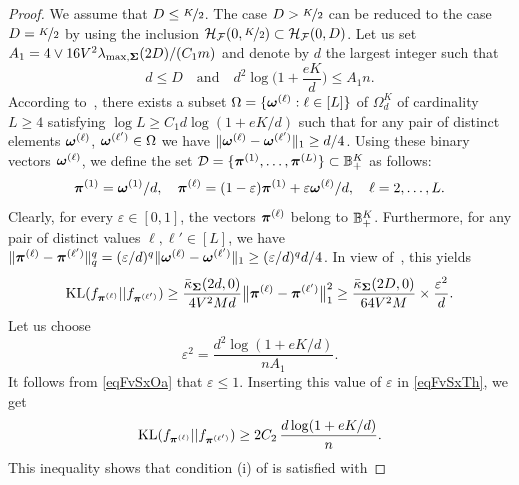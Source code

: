 \begin{proof}
	We assume that $D \leq \nicefrac{K}2$. The case $D> \nicefrac{K}2$ can be reduced to the
	case $D = \nicefrac{K}2$ by using the inclusion $\mathcal H_\mathcal F(0,\nicefrac{K}2)\subset \mathcal H_\mathcal F(0,D)$. Let us set $A_1 = 4\vee {16 V^2\lambda_{\max,\boldsymbol\Sigma}(2D)}/{(C_1 m)}$ 
	and denote by $d$ the largest integer such that
	\begin{equation}\label{eqFvSxOa}
	d\le D\quad\text{and}\quad d^2\log\Big(1+\frac{e  K}{d}\Big)\le A_1 n.
	\end{equation}
	According to~, there exists a subset
	$\Omega = \{\boldsymbol \omega^{(\ell)}:\ell\in[L]\}$ of  $\Omega_{d}^{K}$ of cardinality $L\ge 4$
	satisfying $\log L\geq {C_1 d}\log(1+{eK}/{d})$ such that for any pair of distinct 
	elements $\boldsymbol \omega^{(\ell)}$, $\boldsymbol \omega^{(\ell')}\in \Omega$ we have
	$\|\boldsymbol \omega^{(\ell)}-\boldsymbol \omega^{(\ell')}\|_1 \geq d/4$. Using these binary vectors $\boldsymbol \omega^{(\ell)}$, we define the set $\mathcal{D} =
	\{ \boldsymbol \pi^{(1)},\dots,\boldsymbol \pi^{(L)}\}\subset {\mathbb B}_+^{K}$ as follows:
	\begin{equation}\label{eqFvSxTw}
	\boldsymbol \pi^{(1)}=\boldsymbol \omega^{(1)}/d,\quad
	\boldsymbol \pi^{(\ell)}=(1-\varepsilon)\boldsymbol \pi^{(1)}+\varepsilon \boldsymbol \omega^{(\ell)}/d,\quad \ell=2,\ldots,L.
	\end{equation}
	Clearly, for every $\varepsilon\in[0,1]$, the vectors $\boldsymbol \pi^{(\ell)}$ belong to  ${\mathbb B}^K_+$.
	Furthermore, for any pair of distinct
	values $\ell,\ell'\in[L]$, we have $\|\boldsymbol \pi^{(\ell)}-\boldsymbol \pi^{(\ell')}\|_q^q = (\varepsilon/d)^q
	\|\boldsymbol \omega^{(\ell)}-\boldsymbol \omega^{(\ell')}\|_1\ge (\varepsilon/d)^qd/4$.  In view of~,
	this yields
	\begin{equation}\label{eqFvSxTh}
	{\rm KL}(f_{\boldsymbol \pi^{(\ell)}}||f_{\boldsymbol \pi^{(\ell')}})
	\geq \frac{\bar\kappa_{\boldsymbol\Sigma}(2d,0)}{4V^2M d} \big{\|}\boldsymbol \pi^{(\ell)} - \boldsymbol \pi^{(\ell')}\big{\|}_1^2
	\geq \frac{\bar\kappa_{\boldsymbol\Sigma}(2D,0)}{64V^2M}\times\frac{\varepsilon^2}{d}.
	\end{equation}
	Let us choose
	\begin{equation}
	\varepsilon^2 = \frac{d^2 \log(1+e  K/d)}{n A_1}.
	\end{equation}
	It follows from \eqref{eqFvSxOa} that $\varepsilon\le 1$. Inserting this value of
	$\varepsilon$ in \eqref{eqFvSxTh}, we get
	\begin{equation}
	{\rm KL}(f_{\boldsymbol \pi^{(\ell)}}||f_{\boldsymbol \pi^{(\ell')}}) \geq 2 C_2\,\frac{d\log(1+e  K/d)}{n}.
	\end{equation}
	This inequality  shows that condition (i) of  is satisfied with

\end{proof}
